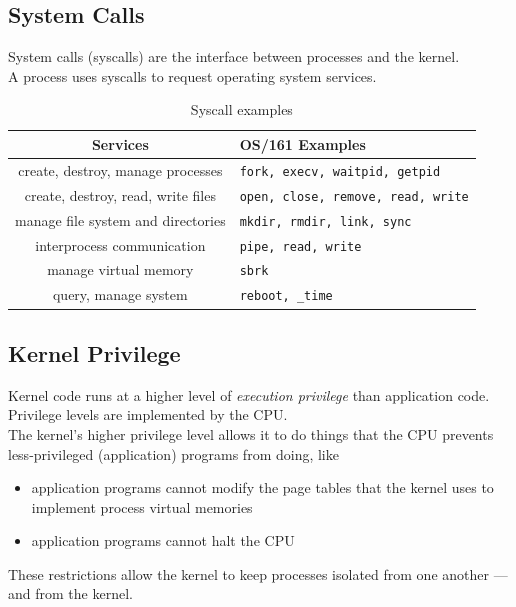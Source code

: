 \documentclass[12pt]{article}
\theoremstyle{plain}
\theoremstyle{definition}
\begin{document}
\subsection{System Calls}
System calls (syscalls) are the interface between processes and the kernel. \\
A process uses syscalls to request operating system services.
\begin{table}[H]
  \vspace{-20pt}
  \caption{Syscall examples}
  \label{tab:ex_syscall}
  \centering
  \begin{tabular}{c|l}
  Services & OS/161 Examples \\ \hline
  create, destroy, manage processes & \texttt{fork, execv, waitpid, getpid} \\
  create, destroy, read, write files & \texttt{open, close, remove, read, write} \\
  manage file system and directories & \texttt{mkdir, rmdir, link, sync} \\
  interprocess communication & \texttt{pipe, read, write} \\
  manage virtual memory & \texttt{sbrk} \\
  query, manage system & \texttt{reboot, \_time}
  \end{tabular}
\end{table}

\subsection{Kernel Privilege}
Kernel code runs at a higher level of \emph{execution privilege} than application code. \\
Privilege levels are implemented by the CPU. \\

The kernel's higher privilege level allows it to do things that the CPU prevents less-privileged (application) programs from doing, like
\begin{itemize}
  \item application programs cannot modify the page tables that the kernel uses to implement process virtual memories
  \item application programs cannot halt the CPU
\end{itemize}

These restrictions allow the kernel to keep processes isolated from one another --- and from the kernel. \\
\end{document}
